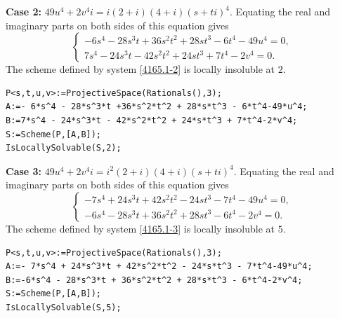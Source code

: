 \documentclass[a4paper,12pt,english,reqno]{amsart}
\begin{document}
{\bf Case 2:} $49u^4+2v^4i=i(2+i)(4+i)(s+ti)^4$. Equating the real and imaginary parts on both sides of this equation gives
\begin{equation}\label{4165.1-2}
\begin{cases}
-6s^4 - 28s^3t + 36s^2t^2 + 28st^3 - 6t^4 - 49u^4=0,\\
7s^4 - 24s^3t - 42s^2t^2 + 24st^3 + 7t^4 - 2v^4=0.
\end{cases}
\end{equation}
The scheme defined by system \eqref{4165.1-2} is locally insoluble at $2$.

\begin{lstlisting}
P<s,t,u,v>:=ProjectiveSpace(Rationals(),3);
A:=- 6*s^4 - 28*s^3*t +36*s^2*t^2 + 28*s*t^3 - 6*t^4-49*u^4;
B:=7*s^4 - 24*s^3*t - 42*s^2*t^2 + 24*s*t^3 + 7*t^4-2*v^4;
S:=Scheme(P,[A,B]);
IsLocallySolvable(S,2);
\end{lstlisting}

{\bf Case 3:} $49u^4+2v^4i=i^2(2+i)(4+i)(s+ti)^4$. Equating the real and imaginary parts on both sides of this equation gives
\begin{equation}\label{4165.1-3}
\begin{cases}
-7s^4 + 24s^3t + 42s^2t^2 - 24st^3 - 7t^4 - 49u^4=0,\\
-6s^4 - 28s^3t + 36s^2t^2 + 28st^3 - 6t^4 - 2v^4=0.
\end{cases}
\end{equation}
The scheme defined by system \eqref{4165.1-3} is locally insoluble at $5$.

\begin{lstlisting}
P<s,t,u,v>:=ProjectiveSpace(Rationals(),3);
A:=- 7*s^4 + 24*s^3*t + 42*s^2*t^2 - 24*s*t^3 - 7*t^4-49*u^4;
B:=-6*s^4 - 28*s^3*t + 36*s^2*t^2 + 28*s*t^3 - 6*t^4-2*v^4;
S:=Scheme(P,[A,B]);
IsLocallySolvable(S,5);
\end{lstlisting}
\end{document}
